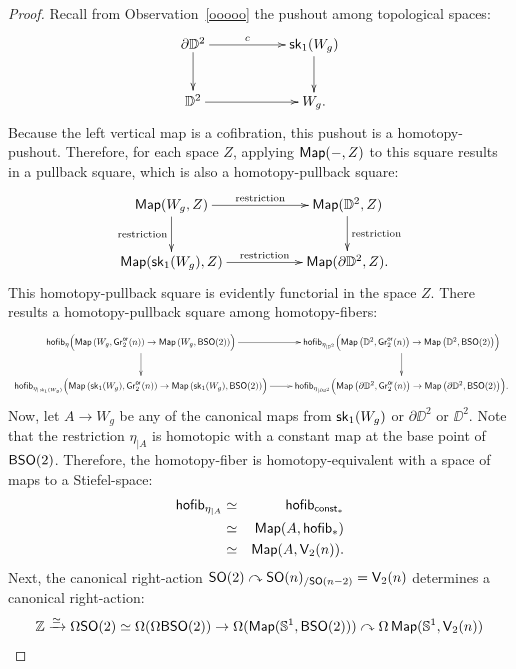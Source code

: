 \begin{proof}
Recall from Observation~\ref{ooooo} the pushout among topological spaces:
\[
\xymatrix{
\partial \DD^2 
\ar[rr]^-c
\ar[d]
&&
\sk_1(W_g)
\ar[d]
\\
\DD^2
\ar[rr]
&&
W_g
.
}
\]
Because the left vertical map is a cofibration, this pushout is a homotopy-pushout.
Therefore, for each space $Z$, applying $\operatorname{{\sf Map}}(-,Z)$ to this square results in a pullback square, which is also a homotopy-pullback square:
\[
\xymatrix{
\Map(W_g , Z)
\ar[rr]^-{\rm restriction}
\ar[d]_-{\rm restriction}
&&
\Map(\DD^2 , Z)
\ar[d]^-{\rm restriction}
\\
\Map(\sk_1(W_g) , Z)
\ar[rr]^-{\rm restriction}
&&
\Map(\partial \DD^2 , Z)
.
}
\]
This homotopy-pullback square is evidently functorial in the space $Z$.
There results a homotopy-pullback square among homotopy-fibers:
\begin{equation}
\label{b1z}
\resizebox{40em}{!}{
\xymatrix{
{\sf hofib}_{\eta} \Bigl(
\Map\left( W_g , \Gr^{\sf or}_2(n) \right) 
\to
\Map\left( W_g , {\sf BSO}(2) \right) 
\Bigr)
\ar[r]
\ar[d]
&
{\sf hofib}_{\eta_{|\DD^2}} \Bigl(
\Map\left( \DD^2 , \Gr^{\sf or}_2(n) \right) 
\to
\Map\left( \DD^2 , {\sf BSO}(2) \right) 
\Bigr)
\ar[d]
\\
{\sf hofib}_{\eta_{|\sk_1(W_g)}} \Bigl(
\Map\left( \sk_1(W_g) , \Gr^{\sf or}_2(n) \right) 
\to
\Map\left( \sk_1(W_g) , {\sf BSO}(2) \right) 
\Bigr)
\ar[r]
&
{\sf hofib}_{\eta_{|\partial \DD^2}} \Bigl(
\Map\left( \partial \DD^2 , \Gr^{\sf or}_2(n) \right) 
\to
\Map\left( \partial \DD^2 , {\sf BSO}(2) \right) 
\Bigr)
.
}
}
\end{equation}
Now, let $A \to W_g$ be any of the canonical maps from $\operatorname{\mathsf{sk}}_1(W_g)$ or $\partial \DD^2$ or $\DD^2$.
Note that the restriction $\eta_{|A}$ is homotopic with a constant map at the base point of ${\sf BSO}(2)$.
Therefore, the homotopy-fiber is homotopy-equivalent with a space of maps to a Stiefel-space:
\begin{eqnarray}
\label{b3z}
{\sf hofib}_{\eta_{|A}}
&
\simeq
&
{\sf hofib}_{{\sf const}_\ast}
\\
\nonumber
&
\simeq
&
\operatorname{{\sf Map}}( A , {\sf hofib}_\ast )
\\
\nonumber
&
\simeq
&
\operatorname{{\sf Map}}(A , \mathsf V_2(n) )
.
\end{eqnarray}
Next, the canonical right-action ${\sf SO}(2) \curvearrowright {\sf SO}(n)_{/{\sf SO}(n-2)} = \mathsf V_2(n)$ determines a canonical right-action:
\[
\mathbb Z \xrightarrow{\simeq} \Omega {\sf SO}(2) \simeq \Omega( \Omega {\sf BSO}(2) ) \to \Omega ( \operatorname{{\sf Map}}(\mathbb S^1 , {\sf BSO}(2))) \curvearrowright \Omega \operatorname{{\sf Map}}( \mathbb S^1 , \mathsf V_2(n) )
\]
\end{proof}
